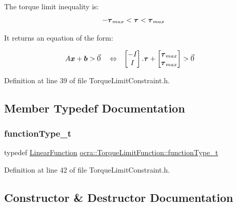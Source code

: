 The torque limit inequality is\+: \[ - \mbox{\boldmath${\tau}$}_{max} < \mbox{\boldmath${\tau}$} < \mbox{\boldmath${\tau}$}_{max} \]

It returns an equation of the form\+:

\begin{align*} A \mbox{\boldmath${x}$} + \mbox{\boldmath${b}$} &> \vec{0} & &\Leftrightarrow & \begin{bmatrix} - I_{} \\ I_{} \end{bmatrix} . \mbox{\boldmath${\tau}$} + \begin{bmatrix} \mbox{\boldmath${\tau}$}_{max} \\ \mbox{\boldmath${\tau}$}_{max} \end{bmatrix} &> \vec{0} \end{align*} 

Definition at line 39 of file Torque\+Limit\+Constraint.\+h.



\subsection{Member Typedef Documentation}
\hypertarget{classocra_1_1TorqueLimitFunction_a0c9d97d4e11ee173ae359698d6c95b25}{}\label{classocra_1_1TorqueLimitFunction_a0c9d97d4e11ee173ae359698d6c95b25} 
\subsubsection{\texorpdfstring{function\+Type\+\_\+t}{functionType\_t}}
{\footnotesize\ttfamily typedef \hyperlink{classocra_1_1LinearFunction}{Linear\+Function} \hyperlink{classocra_1_1TorqueLimitFunction_a0c9d97d4e11ee173ae359698d6c95b25}{ocra\+::\+Torque\+Limit\+Function\+::function\+Type\+\_\+t}}



Definition at line 42 of file Torque\+Limit\+Constraint.\+h.



\subsection{Constructor \& Destructor Documentation}
\hypertarget{classocra_1_1TorqueLimitFunction_a3ca04338256c4a0bf484f29dc7aeb06d}{}\label{classocra_1_1TorqueLimitFunction_a3ca04338256c4a0bf484f29dc7aeb06d} 
